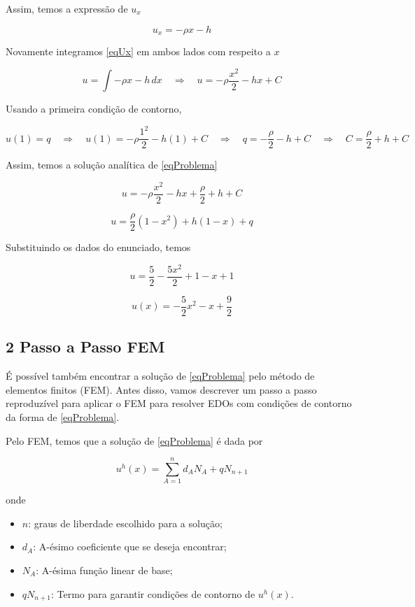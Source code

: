 \documentclass[12pt]{scrartcl}
\newcommand{\logo}{\quad \Rightarrow \quad}
\begin{document}
Assim, temos a expressão de $u_x$

\begin{equation}\label{eqUx}
    u_x = - \rho x  - h
\end{equation}

Novamente integramos \eqref{eqUx} em ambos lados com respeito a $x$

\[
    u = \int -\rho x - h \, dx
    \logo
    u = - \rho \frac{x^2}{2} - hx + C
\]

Usando a primeira condição de contorno,

\[
    u(1) = q
    \logo
    u(1) = - \rho \frac{1^2}{2} - h(1) + C
    \logo
    q = - \frac{\rho}{2} - h + C
    \logo
    C = \frac{\rho}{2} + h + C
\]

Assim, temos a solução analítica de \eqref{eqProblema}

\[
    u = - \rho \frac{x^2}{2} - hx + \frac{\rho}{2} + h + C
\]

\begin{equation}\label{eqU}
    u = \frac{\rho}{2} \left(1 - x^2\right) + h\left(1 - x\right) + q
\end{equation}

Substituindo os dados do enunciado, temos

\[
    u = \frac{5}{2} - \frac{5x^2}{2} + 1 - x + 1
\]

\begin{equation}\label{eqUsubstituida}
    u(x) = -\frac{5}{2}x^2 - x + \frac{9}{2}
\end{equation}

\subsection*{2 Passo a Passo FEM}

É possível também encontrar a solução de \eqref{eqProblema} pelo método de elementos finitos (FEM).
Antes disso, vamos descrever um passo a passo
reproduzível para aplicar o FEM para resolver EDOs com condições de contorno da forma de \eqref{eqProblema}.
\newline

Pelo FEM, temos que a solução de \eqref{eqProblema} é dada por

\begin{equation}\label{eqUhFEM}
    u^h(x) = \sum_{A=1}^n d_AN_A + qN_{n+1}
\end{equation}

onde

\begin{itemize}
    \item $n$: graus de liberdade escolhido para a solução;
    \item $d_A$: A-ésimo coeficiente que se deseja encontrar;
    \item $N_A$: A-ésima função linear de base;
    \item $qN_{n+1}$: Termo para garantir condições de contorno de $u^h(x)$.
\end{itemize}
\end{document}

